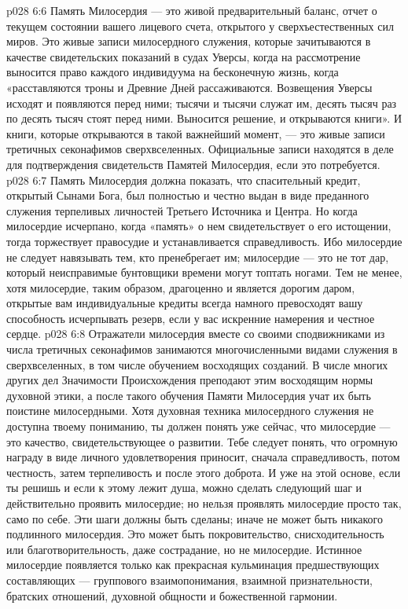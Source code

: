 \vs p028 6:6 Память Милосердия --- это живой предварительный баланс, отчет о текущем состоянии вашего лицевого счета, открытого у сверхъестественных сил миров. Это живые записи милосердного служения, которые зачитываются в качестве свидетельских показаний в судах Уверсы, когда на рассмотрение выносится право каждого индивидуума на бесконечную жизнь, когда «расставляются троны и Древние Дней рассаживаются. Возвещения Уверсы исходят и появляются перед ними; тысячи и тысячи служат им, десять тысяч раз по десять тысяч стоят перед ними. Выносится решение, и открываются книги». И книги, которые открываются в такой важнейший момент, --- это живые записи третичных секонафимов сверхвселенных. Официальные записи находятся в деле для подтверждения свидетельств Памятей Милосердия, если это потребуется.
\vs p028 6:7 Память Милосердия должна показать, что спасительный кредит, открытый Сынами Бога, был полностью и честно выдан в виде преданного служения терпеливых личностей Третьего Источника и Центра. Но когда милосердие исчерпано, когда «память» о нем свидетельствует о его истощении, тогда торжествует правосудие и устанавливается справедливость. Ибо милосердие не следует навязывать тем, кто пренебрегает им; милосердие --- это не тот дар, который неисправимые бунтовщики времени могут топтать ногами. Тем не менее, хотя милосердие, таким образом, драгоценно и является дорогим даром, открытые вам индивидуальные кредиты всегда намного превосходят вашу способность исчерпывать резерв, если у вас искренние намерения и честное сердце.
\vs p028 6:8 \pc Отражатели милосердия вместе со своими сподвижниками из числа третичных секонафимов занимаются многочисленными видами служения в сверхвселенных, в том числе обучением восходящих созданий. В числе многих других дел Значимости Происхождения преподают этим восходящим нормы духовной этики, а после такого обучения Памяти Милосердия учат их быть поистине милосердными. Хотя духовная техника милосердного служения не доступна твоему пониманию, ты должен понять уже сейчас, что милосердие --- это качество, свидетельствующее о развитии. Тебе следует понять, что огромную награду в виде личного удовлетворения приносит, сначала справедливость, потом честность, затем терпеливость и после этого доброта. И уже на этой основе, если ты решишь и если к этому лежит душа, можно сделать следующий шаг и действительно проявить милосердие; но нельзя проявлять милосердие просто так, само по себе. Эти шаги должны быть сделаны; иначе не может быть никакого подлинного милосердия. Это может быть покровительство, снисходительность или благотворительность, даже сострадание, но не милосердие. Истинное милосердие появляется только как прекрасная кульминация предшествующих составляющих --- группового взаимопонимания, взаимной признательности, братских отношений, духовной общности и божественной гармонии.
